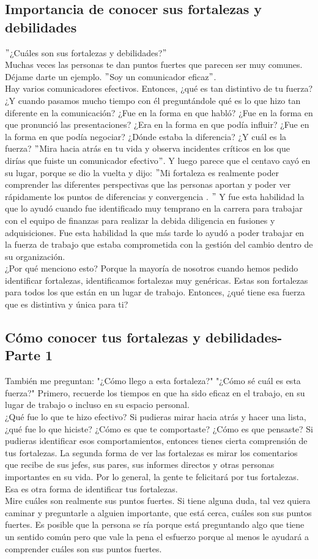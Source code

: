 \documentclass[10pt]{book}
\begin{document}
\subsection{Importancia de conocer sus fortalezas y debilidades}
$"$¿Cuáles son sus fortalezas y debilidades?$"$\\
Muchas veces las personas te dan puntos fuertes que parecen ser muy comunes. Déjame darte un ejemplo. $"$Soy un comunicador eficaz$"$.\\
Hay varios comunicadores efectivos. Entonces, ¿qué es tan distintivo de tu fuerza? ¿Y cuando pasamos mucho tiempo con él preguntándole qué es lo que hizo tan diferente en la comunicación? ¿Fue en la forma en que habló? ¿Fue en la forma en que pronunció las presentaciones? ¿Era en la forma en que podía influir? ¿Fue en la forma en que podía negociar? ¿Dónde estaba la diferencia? ¿Y cuál es la fuerza?  $"$Mira hacia atrás en tu vida y observa incidentes críticos en los que dirías que fuiste un comunicador efectivo$"$. Y luego parece que el centavo cayó en su lugar, porque se dio la vuelta y dijo: $"$Mi fortaleza es realmente poder comprender las diferentes perspectivas que las personas aportan y poder ver rápidamente los puntos de diferencias y convergencia . $"$ Y fue esta habilidad la que lo ayudó cuando fue identificado muy temprano en la carrera para trabajar con el equipo de finanzas para realizar la debida diligencia en fusiones y adquisiciones. Fue esta habilidad la que más tarde lo ayudó a poder trabajar en la fuerza de trabajo que estaba comprometida con la gestión del cambio dentro de su organización.\\
¿Por qué menciono esto? Porque la mayoría de nosotros cuando hemos pedido identificar fortalezas, identificamos fortalezas muy genéricas. Estas son fortalezas para todos los que están en un lugar de trabajo. Entonces, ¿qué tiene esa fuerza que es distintiva y única para ti?
\subsection{Cómo conocer tus fortalezas y debilidades-Parte 1}
También me preguntan: "¿Cómo llego a esta fortaleza?" "¿Cómo sé cuál es esta fuerza?" Primero, recuerde los tiempos en que ha sido eficaz en el trabajo, en su lugar de trabajo o incluso en su espacio personal.\\
¿Qué fue lo que te hizo efectivo? Si pudieras mirar hacia atrás y hacer una lista, ¿qué fue lo que hiciste? ¿Cómo es que te comportaste? ¿Cómo es que pensaste? Si pudieras identificar esos comportamientos, entonces tienes cierta comprensión de tus fortalezas. La segunda forma de ver las fortalezas es mirar los comentarios que recibe de sus jefes, sus pares, sus informes directos y otras personas importantes en su vida. Por lo general, la gente te felicitará por tus fortalezas. Esa es otra forma de identificar tus fortalezas.\\
Mire cuáles son realmente sus puntos fuertes. Si tiene alguna duda, tal vez quiera caminar y preguntarle a alguien importante, que está cerca, cuáles son sus puntos fuertes. Es posible que la persona se ría porque está preguntando algo que tiene un sentido común pero que vale la pena el esfuerzo porque al menos le ayudará a comprender cuáles son sus puntos fuertes.
\end{document}
